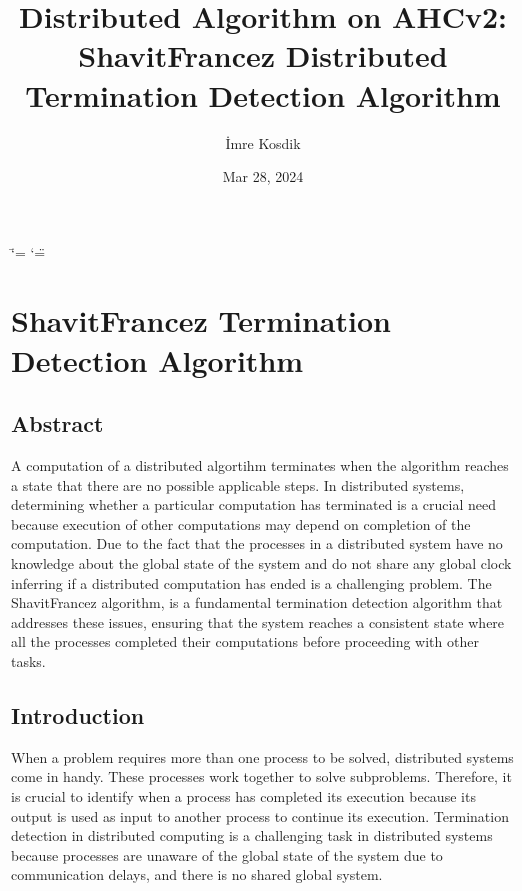 \documentclass[letterpaper,10pt,english]{sphinxmanual}
\title{Distributed Algorithm on AHCv2: Shavit\sphinxhyphen{}Francez Distributed Termination Detection Algorithm}
\date{Mar 28, 2024}
\author{İmre Kosdik}
\begin{document}
\ifdefined\shorthandoff
  \ifnum\catcode`\=\string=\active\shorthandoff{=}\fi
  \ifnum\catcode`\"=\active{}\fi
\fi

\pagestyle{empty}
\sphinxmaketitle
\pagestyle{plain}
\sphinxtableofcontents
\pagestyle{normal}
\label{\detokenize{index::doc}}


\sphinxstepscope


\chapter{Shavit\sphinxhyphen{}Francez Termination Detection Algorithm}
\label{\detokenize{docs/ShavitFrancezAlg/ShavitFrancezAlg:shavitfrancezalg}}\label{\detokenize{docs/ShavitFrancezAlg/ShavitFrancezAlg::doc}}
\sphinxstepscope


\section{Abstract}
\label{\detokenize{docs/ShavitFrancezAlg/abstract:abstract}}\label{\detokenize{docs/ShavitFrancezAlg/abstract::doc}}
\sphinxAtStartPar
A computation of a distributed algortihm terminates when the algorithm reaches a state that there are no possible applicable steps. In distributed systems, determining whether a particular computation has terminated is a crucial need because execution of other computations may depend on completion of the computation. Due to the fact that the processes in a distributed system have no knowledge about the global state of the system and do not share any global clock inferring if a distributed computation has ended is a challenging problem. The Shavit\sphinxhyphen{}Francez algorithm, is a fundamental termination detection algorithm that addresses these issues, ensuring that the system reaches a consistent state where all the processes completed their computations before proceeding with other tasks.

\sphinxstepscope


\section{Introduction}
\label{\detokenize{docs/ShavitFrancezAlg/introduction:introduction}}\label{\detokenize{docs/ShavitFrancezAlg/introduction::doc}}
\sphinxAtStartPar
When a problem requires more than one process to be solved, distributed systems come in handy. These processes work together to solve subproblems. Therefore, it is crucial to identify when a process has completed its execution because its output is used as input to another process to continue its execution. Termination detection in distributed computing is a challenging task in distributed systems because processes are unaware of the global state of the system due to communication delays, and there is no shared global system.
\end{document}
